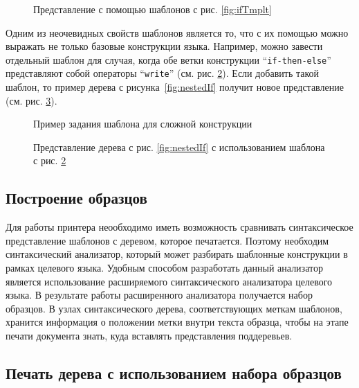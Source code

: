 \begin{figure}[h!]
	\centering
	
	\caption{Представление с помощью шаблонов с рис. \ref{fig:ifTmplt}}
	\label{fig:nestedIfCode}
\end{figure}

Одним из неочевидных свойств шаблонов является то, что с их помощью можно выражать не только базовые конструкции языка.
Например, можно завести отдельный шаблон для случая, когда обе ветки конструкции “\lstinline{if-then-else}” представляют собой операторы “\lstinline{write}” (см. рис. \ref{fig:writeNestedInIf}). Если добавить такой шаблон, то пример дерева с рисунка~\ref{fig:nestedIf} получит новое представление (см. рис. \ref{fig:nestedIfNew}).

\begin{figure}[h!]
	
	\caption{Пример задания шаблона для сложной конструкции}
	\label{fig:writeNestedInIf}
\end{figure}

\begin{figure}[h!]
	
	\caption{Представление дерева с рис. \ref{fig:nestedIf} с использованием шаблона с рис. \ref{fig:writeNestedInIf}}
	\label{fig:nestedIfNew}
\end{figure}

\subsection{Построение образцов}

Для работы принтера неообходимо иметь возможность сравнивать синтаксическое представление шаблонов с деревом, которое печатается. Поэтому необходим синтаксический анализатор, который может разбирать шаблонные конструкции в рамках целевого языка. Удобным способом разработать данный анализатор является использование расширяемого синтаксического анализатора целевого языка. В результате работы расширенного анализатора получается набор образцов. В узлах синтаксического дерева, соответствующих меткам шаблонов, хранится информация о положении метки внутри текста образца, чтобы на этапе печати документа знать, куда вставлять представления поддеревьев.

\subsection{Печать дерева с использованием набора образцов}

